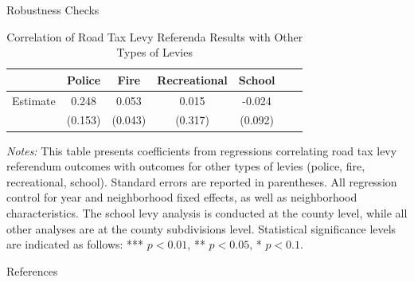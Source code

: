 \documentclass{beamer}
\begin{document}
\begin{frame}{Robustness Checks}
    \begin{table}[ht!]
        \centering
        \caption{Correlation of Road Tax Levy Referenda Results with Other Types of Levies}
        \begin{tabular}{lcccccc}
        \toprule
        & Police & Fire & Recreational & School \\
        \midrule
        Estimate & 0.248 & 0.053 & 0.015 & -0.024 \\
        & (0.153) & (0.043) & (0.317) & (0.092) \\
        \bottomrule
        \end{tabular}
        \begin{minipage}{\textwidth}
        \footnotesize
        \textit{Notes:} This table presents coefficients from regressions correlating road tax levy referendum outcomes with outcomes for other types of levies (police, fire, recreational, school). Standard errors are reported in parentheses. All regression control for year and neighborhood fixed effects, as well as neighborhood characteristics. The school levy analysis is conducted at the county level, while all other analyses are at the county subdivisions level. Statistical significance levels are indicated as follows: *** $p<0.01$, ** $p<0.05$, * $p<0.1$.
        \end{minipage}
    \end{table}
\end{frame}

\begin{frame}[allowframebreaks]{References}
    
\end{frame}
\end{document}
